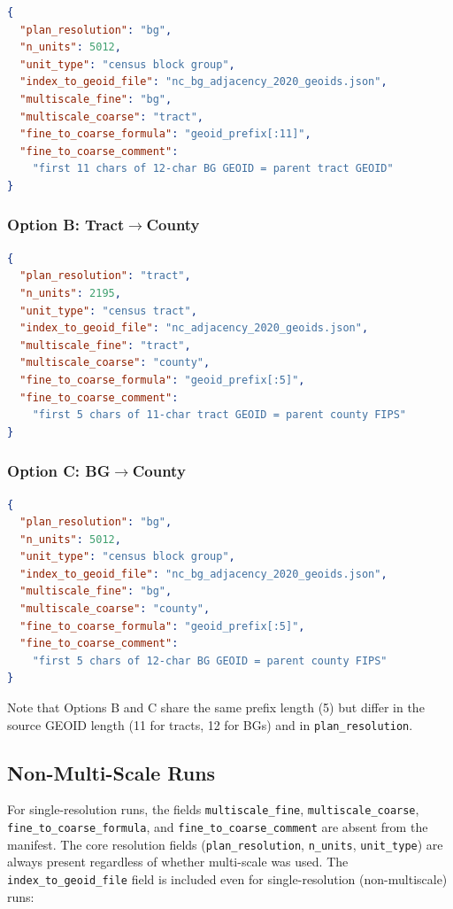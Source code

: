 \begin{lstlisting}[language=json]
{
  "plan_resolution": "bg",
  "n_units": 5012,
  "unit_type": "census block group",
  "index_to_geoid_file": "nc_bg_adjacency_2020_geoids.json",
  "multiscale_fine": "bg",
  "multiscale_coarse": "tract",
  "fine_to_coarse_formula": "geoid_prefix[:11]",
  "fine_to_coarse_comment":
    "first 11 chars of 12-char BG GEOID = parent tract GEOID"
}
\end{lstlisting}

\subsubsection{Option B: Tract$\to$County}

\begin{lstlisting}[language=json]
{
  "plan_resolution": "tract",
  "n_units": 2195,
  "unit_type": "census tract",
  "index_to_geoid_file": "nc_adjacency_2020_geoids.json",
  "multiscale_fine": "tract",
  "multiscale_coarse": "county",
  "fine_to_coarse_formula": "geoid_prefix[:5]",
  "fine_to_coarse_comment":
    "first 5 chars of 11-char tract GEOID = parent county FIPS"
}
\end{lstlisting}

\subsubsection{Option C: BG$\to$County}

\begin{lstlisting}[language=json]
{
  "plan_resolution": "bg",
  "n_units": 5012,
  "unit_type": "census block group",
  "index_to_geoid_file": "nc_bg_adjacency_2020_geoids.json",
  "multiscale_fine": "bg",
  "multiscale_coarse": "county",
  "fine_to_coarse_formula": "geoid_prefix[:5]",
  "fine_to_coarse_comment":
    "first 5 chars of 12-char BG GEOID = parent county FIPS"
}
\end{lstlisting}

\noindent
Note that Options B and C share the same prefix length (5) but differ in
the source GEOID length (11 for tracts, 12 for BGs) and in
\texttt{plan\_resolution}.

\subsection{Non-Multi-Scale Runs}

For single-resolution runs, the fields \texttt{multiscale\_fine},
\texttt{multiscale\_coarse}, \texttt{fine\_to\_coarse\_formula},
and \texttt{fine\_to\_coarse\_comment} are absent from the manifest.
The core resolution fields (\texttt{plan\_resolution}, \texttt{n\_units},
\texttt{unit\_type}) are always present regardless of whether multi-scale
was used.
The \texttt{index\_to\_geoid\_file} field is included even for
single-resolution (non-multiscale) runs:

